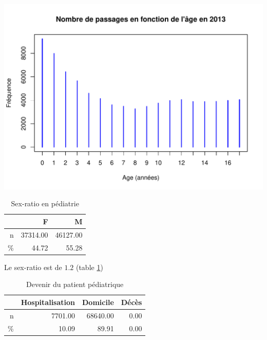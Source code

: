\documentclass[12pt,english,french,twoside]{book}\usepackage[]{graphicx}\usepackage[]{color}
\makeatletter
\def\maxwidth{ %
  \ifdim\Gin@nat@width>\linewidth
    \linewidth
  \else
    \Gin@nat@width
  \fi
}
\newenvironment{knitrout}{}{} %
\makeatother
\begin{document}
\begin{knitrout}
\color{fgcolor}
\includegraphics[width=\maxwidth]{figure/passages_pediatrie-1} 

\end{knitrout}


\begin{table}[ht]
\centering
\begin{tabular}{rrr}
  \hline
 & F & M \\ 
  \hline
n & 37314.00 & 46127.00 \\ 
  \% & 44.72 & 55.28 \\ 
   \hline
\end{tabular}
\caption[Sex-ratio en pédiatrie]{Sex-ratio en pédiatrie} 
\label{tab:ped_sr}
\end{table}


Le sex-ratio est de $1.2$ (table \ref{tab:ped_sr})


\begin{table}[ht]
\centering
\begin{tabular}{rrrr}
  \hline
 & Hospitalisation & Domicile & Décès \\ 
  \hline
n & 7701.00 & 68640.00 & 0.00 \\ 
  \% & 10.09 & 89.91 & 0.00 \\ 
   \hline
\end{tabular}
\caption[Devenir du patient pédiatrique]{Devenir du patient pédiatrique} 
\label{tab:ped_hosp}
\end{table}
\end{document}
